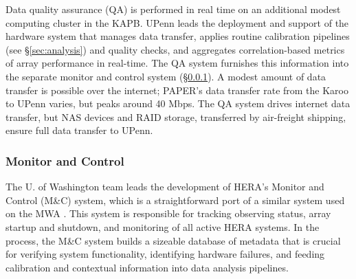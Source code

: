\documentclass[preprint]{aastex}
\newcommand{\Mycitep}[1]{{\bf \citep{#1}}}
\newcommand{\compress}{\vspace{-0.25in}}
\begin{document}
Data quality assurance (QA) is performed in real time on an additional modest 
computing cluster in the
KAPB.  UPenn leads the deployment and support of the hardware system that
manages data transfer, applies routine calibration pipelines (see \S\ref{sec:analysis}) and quality
checks, and aggregates correlation-based metrics of array performance in real-time.  The QA system
furnishes this information into the separate monitor and control system (\S\ref{sec:monitor}).
A modest amount of data transfer is possible over the internet; PAPER's data transfer rate from the Karoo
to UPenn varies, but peaks around 40 Mbps.  The QA system drives internet data transfer, but
NAS devices and RAID storage, transferred by air-freight shipping, ensure full data transfer to UPenn.




\compress
\subsubsection{Monitor and Control}
\label{sec:monitor}

The U. of Washington team leads the development of HERA's Monitor and Control (M\&C) system,
which is a straightforward port of a similar system used on the MWA \Mycitep{tingay_et_al2013}.
This system is
responsible for tracking observing status, array startup and shutdown, and
monitoring of all active HERA systems. In the process, the M\&C system builds a sizeable database of 
metadata that is crucial for verifying system functionality, identifying hardware failures, and feeding
calibration and contextual information into data analysis pipelines.  
\end{document}
